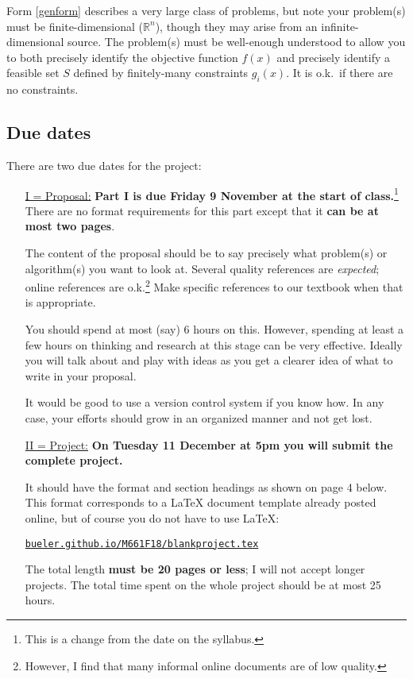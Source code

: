 \documentclass[12pt]{amsart}
\newcommand{\RR}{\mathbb{R}}
\begin{document}
Form \eqref{genform} describes a very large class of problems, but note your problem(s) must be finite-dimensional ($\RR^n$), though they may arise from an infinite-dimensional source.  The problem(s) must be well-enough understood to allow you to both precisely identify the objective function $f(x)$ and precisely identify a feasible set $S$ defined by finitely-many constraints $g_i(x)$.  It is o.k.~if there are no constraints.  


\subsection*{Due dates}  There are two due dates for the project:

\medskip
\begin{itemize}
\item[\underline{I = Proposal:}]  \textbf{Part I is due Friday 9 November at the start of class.}\footnote{This is a change from the date on the syllabus.}  There are no format requirements for this part except that it \textbf{can be at most two pages}.

The content of the proposal should be to say precisely what problem(s) or algorithm(s) you want to look at.  Several quality references are \emph{expected}; online references are o.k.\footnote{However, I find that many informal online documents are of low quality.}  Make specific references to our textbook when that is appropriate.

You should spend at most (say) 6 hours on this.  However, spending at least a few hours on thinking and research at this stage can be very effective.  Ideally you will talk about and play with ideas as you get a clearer idea of what to write in your proposal.

It would be good to use a version control system if you know how.  In any case, your efforts should grow in an organized manner and not get lost.

\medskip
\item[\underline{II = Project:}]  \textbf{On Tuesday 11 December at 5pm you will submit the complete project.}

It should have the format and section headings as shown on page 4 below.  This format corresponds to a \LaTeX\xspace document template already posted online, but of course you do not have to use \LaTeX:

\centerline{\href{http://bueler.github.io/M661F18/index.html}{\texttt{bueler.github.io/M661F18/blankproject.tex}}}

The total length \textbf{must be 20 pages or less}; I will not accept longer projects.  The total time spent on the whole project should be at most 25 hours.
\end{itemize}
\end{document}
